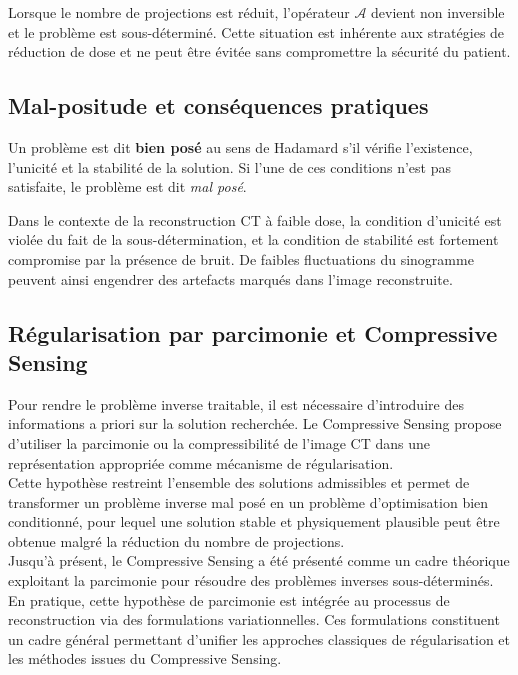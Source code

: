 Lorsque le nombre de projections est réduit, l'opérateur $\mathcal{A}$ devient non inversible
et le problème est sous-déterminé. Cette situation est inhérente aux stratégies de réduction
de dose et ne peut être évitée sans compromettre la sécurité du patient.

\subsection{Mal-positude et conséquences pratiques}

\begin{definition}
    Un problème est dit \textbf{bien posé} au sens de Hadamard s'il vérifie l'existence,
    l'unicité et la stabilité de la solution. Si l'une de ces conditions n'est pas satisfaite,
    le problème est dit \emph{mal posé}.
\end{definition}

Dans le contexte de la reconstruction CT à faible dose, la condition d'unicité est violée
du fait de la sous-détermination, et la condition de stabilité est fortement compromise par
la présence de bruit. De faibles fluctuations du sinogramme peuvent ainsi engendrer des
artefacts marqués dans l'image reconstruite.

\subsection{Régularisation par parcimonie et Compressive Sensing}

Pour rendre le problème inverse traitable, il est nécessaire d'introduire des informations
a priori sur la solution recherchée. Le Compressive Sensing propose d'utiliser la parcimonie
ou la compressibilité de l'image CT dans une représentation appropriée comme mécanisme de
régularisation.\\
Cette hypothèse restreint l'ensemble des solutions admissibles et permet de transformer un
problème inverse mal posé en un problème d'optimisation bien conditionné, pour lequel une
solution stable et physiquement plausible peut être obtenue malgré la réduction du nombre
de projections.\\
Jusqu'à présent, le Compressive Sensing a été présenté comme un cadre
théorique exploitant la parcimonie pour résoudre des problèmes inverses
sous-déterminés. En pratique, cette hypothèse de parcimonie est intégrée
au processus de reconstruction via des formulations variationnelles.
Ces formulations constituent un cadre général permettant d'unifier les
approches classiques de régularisation et les méthodes issues du
Compressive Sensing.

